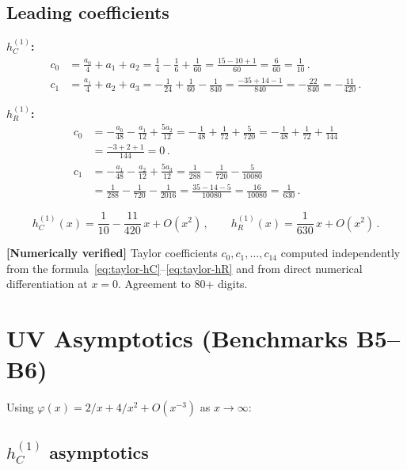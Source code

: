 \documentclass[11pt,a4paper]{article}
\theoremstyle{definition}
\theoremstyle{remark}
\newcommand{\verified}[1]{%
  \par\noindent\colorbox{green!10}{%
    \parbox{\dimexpr\linewidth-2\fboxsep}{%
      \textcolor{green!50!black}{\textbf{[Numerically verified]}}
      \textcolor{green!50!black}{#1}%
    }%
  }\par%
}
\begin{document}
\subsection{Leading coefficients}

\textbf{$h_C^{(1)}$:}
\begin{align*}
  c_0 &= \frac{a_0}{4} + a_1 + a_2
  = \frac{1}{4} - \frac{1}{6} + \frac{1}{60}
  = \frac{15 - 10 + 1}{60} = \frac{6}{60} = \frac{1}{10}\,.\\
  c_1 &= \frac{a_1}{4} + a_2 + a_3
  = -\frac{1}{24} + \frac{1}{60} - \frac{1}{840}
  = \frac{-35 + 14 - 1}{840} = -\frac{22}{840} = -\frac{11}{420}\,.
\end{align*}

\textbf{$h_R^{(1)}$:}
\begin{align*}
  c_0 &= -\frac{a_0}{48} - \frac{a_1}{12} + \frac{5a_2}{12}
  = -\frac{1}{48} + \frac{1}{72} + \frac{5}{720}
  = -\frac{1}{48} + \frac{1}{72} + \frac{1}{144}\\
  &= \frac{-3 + 2 + 1}{144} = 0\,.\\
  c_1 &= -\frac{a_1}{48} - \frac{a_2}{12} + \frac{5a_3}{12}
  = \frac{1}{288} - \frac{1}{720} - \frac{5}{10080}\\
  &= \frac{1}{288} - \frac{1}{720} - \frac{1}{2016}
  = \frac{35 - 14 - 5}{10080} = \frac{16}{10080} = \frac{1}{630}\,.
\end{align*}

\begin{equation}
  \boxed{
  h_C^{(1)}(x) = \frac{1}{10}
    - \frac{11}{420}\,x + O(x^2)\,,\qquad
  h_R^{(1)}(x) = \frac{1}{630}\,x + O(x^2)\,.
  }
  \label{eq:taylor-results}
\end{equation}

\verified{Taylor coefficients $c_0, c_1, \ldots, c_{14}$ computed
independently from the formula~\eqref{eq:taylor-hC}--\eqref{eq:taylor-hR}
and from direct numerical differentiation at $x = 0$.
Agreement to 80+ digits.}


\section{UV Asymptotics (Benchmarks B5--B6)}
\label{sec:asymptotics}

Using $\varphi(x) = 2/x + 4/x^2 + O(x^{-3})$ as $x \to \infty$:

\subsection{$h_C^{(1)}$ asymptotics}
\end{document}
